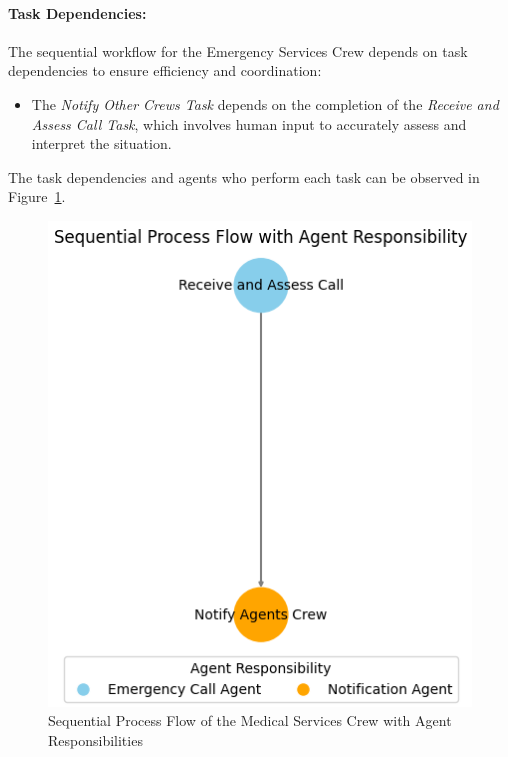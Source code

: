 \paragraph{Task Dependencies:}

The sequential workflow for the Emergency Services Crew depends on task dependencies to ensure efficiency and coordination:
\begin{itemize}
    \item The \textit{Notify Other Crews Task} depends on the completion of the \textit{Receive and Assess Call Task}, which 
    involves human input to accurately assess and interpret the situation.
\end{itemize}


The task dependencies and agents who perform each task can be observed in Figure~\ref{fig:emergency_services_flow}.

\begin{figure}[h!]
	\centering
	\includegraphics[height=0.4\textheight]{figures/emergency_services_crew_flow.png}
	\caption{Sequential Process Flow of the Medical Services Crew with Agent Responsibilities}
	\label{fig:emergency_services_flow}
\end{figure} 
